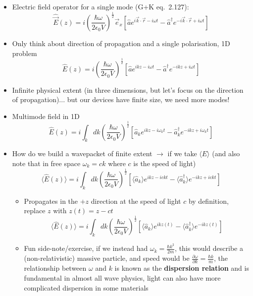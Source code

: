 \documentclass[english]{article}
\newcommand{\average}[1]{\langle #1 \rangle}
\begin{document}
\begin{itemize}
\item Electric field operator for a single mode (G+K eq.~2.127): 
\begin{equation}
\hat{\vec{E}}(z)=i\left(\frac{\hbar \omega}{2 \epsilon_0 V}\right)^\frac{1}{2}\vec{e}_x[\hat{a}e^{i\vec{k}\cdot \vec{r}-i \omega t}-\hat{a}^\dagger e^{-i\vec{k}\cdot\vec{r}+i \omega t}]
\end{equation}
\item Only think about direction of propagation and a single polarisation, 1D problem
\begin{equation}
\hat{E}(z)=i\left(\frac{\hbar \omega}{2 \epsilon_0 V}\right)^\frac{1}{2}[\hat{a}e^{i k z-i \omega t}-\hat{a}^\dagger e^{-ik z+i \omega t}]
\end{equation}
\item Infinite physical extent (in three dimensions, but let's focus on the direction of propagation)... but our devices have finite size, we need more modes!
\item Multimode field in 1D 
\begin{equation}
\hat{E}(z)=i\int_kdk\left(\frac{\hbar \omega}{2 \epsilon_0 V}\right)^\frac{1}{2}[\hat{a}_ke^{i k z-i \omega_k t}-\hat{a}_k^\dagger e^{-ik z+i \omega_k t}]
\end{equation}
\item How do we build a wavepacket of finite extent $\rightarrow$ if we take $\average{E}$ (and also note that in free space $\omega_k=c k$ where $c$ is the speed of light)
\begin{equation}
\average{\hat{E}(z)}=i\int_kdk\left(\frac{\hbar \omega}{2 \epsilon_0 V}\right)^\frac{1}{2}[\average{\hat{a}_k}e^{i k z-i c k t}-\average{\hat{a}_k^\dagger} e^{-ik z+i c k t}]
\end{equation}
\begin{itemize}
\item Propagates in the $+z$ direction at the speed of light $c$ by definition, replace $z$ with $z(t)=z-ct$
\begin{equation}
\average{\hat{E}(z)}=i\int_kdk\left(\frac{\hbar \omega}{2 \epsilon_0 V}\right)^\frac{1}{2}[\average{\hat{a}_k}e^{i k z(t)}-\average{\hat{a}_k^\dagger} e^{-ik z(t)}]
\end{equation}
\item Fun side-note/exercise, if we instead had $\omega_k= \frac{\hbar k^2}{2 m}$, this would describe a (non-relativistic) massive particle, and speed would be $\frac{\partial \omega}{\partial k}=\frac{\hbar k}{m}$, the relationship between $\omega$ and $k$ is known as the \textbf{dispersion relation} and is fundamental in almost all wave physics, light can also have more complicated dispersion in some materials

\end{itemize}
\end{itemize}
\end{document}
